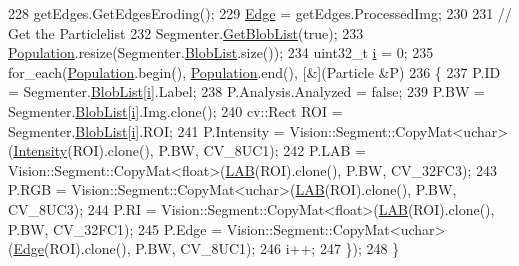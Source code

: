 \begin{DoxyCode}
228         getEdges.GetEdgesEroding();
229         \hyperlink{class_soil_analyzer_1_1_soil_ab867a74ecebcd5a3d84e2f9ea806b874}{Edge} = getEdges.ProcessedImg;
230 
231         \textcolor{comment}{// Get the Particlelist}
232         Segmenter.\hyperlink{class_vision_1_1_segment_a6dba1b8506fe7e8054e99ea5330d4abc}{GetBlobList}(\textcolor{keyword}{true});
233         \hyperlink{class_soil_analyzer_1_1_sample_ab87a190f2b4a49bc71b355f9c52d8aa4}{Population}.resize(Segmenter.\hyperlink{class_vision_1_1_segment_a74e0600a7dd49bd7110ee27bb4cd6e0e}{BlobList}.size());
234         uint32\_t \hyperlink{_comparision_pictures_2_createtest_image_8m_a6f6ccfcf58b31cb6412107d9d5281426}{i} = 0;
235         for\_each(\hyperlink{class_soil_analyzer_1_1_sample_ab87a190f2b4a49bc71b355f9c52d8aa4}{Population}.begin(), \hyperlink{class_soil_analyzer_1_1_sample_ab87a190f2b4a49bc71b355f9c52d8aa4}{Population}.end(), [&](Particle &P) 
236         \{
237             P.ID = Segmenter.\hyperlink{class_vision_1_1_segment_a74e0600a7dd49bd7110ee27bb4cd6e0e}{BlobList}[\hyperlink{_comparision_pictures_2_createtest_image_8m_a6f6ccfcf58b31cb6412107d9d5281426}{i}].Label;
238             P.Analysis.Analyzed = \textcolor{keyword}{false};
239             P.BW = Segmenter.\hyperlink{class_vision_1_1_segment_a74e0600a7dd49bd7110ee27bb4cd6e0e}{BlobList}[\hyperlink{_comparision_pictures_2_createtest_image_8m_a6f6ccfcf58b31cb6412107d9d5281426}{i}].Img.clone();
240             cv::Rect ROI = Segmenter.\hyperlink{class_vision_1_1_segment_a74e0600a7dd49bd7110ee27bb4cd6e0e}{BlobList}[\hyperlink{_comparision_pictures_2_createtest_image_8m_a6f6ccfcf58b31cb6412107d9d5281426}{i}].ROI;
241             P.Intensity = Vision::Segment::CopyMat<uchar>(\hyperlink{class_soil_analyzer_1_1_soil_a6f56200f2722df5b849d8cddd094c852}{Intensity}(ROI).clone(), P.BW, CV\_8UC1);
242             P.LAB = Vision::Segment::CopyMat<float>(\hyperlink{class_soil_analyzer_1_1_soil_a59ee773ff73380a12b1c2af3b86f6638}{LAB}(ROI).clone(), P.BW, CV\_32FC3);
243             P.RGB = Vision::Segment::CopyMat<uchar>(\hyperlink{class_soil_analyzer_1_1_soil_a59ee773ff73380a12b1c2af3b86f6638}{LAB}(ROI).clone(), P.BW, CV\_8UC3);
244             P.RI = Vision::Segment::CopyMat<float>(\hyperlink{class_soil_analyzer_1_1_soil_a59ee773ff73380a12b1c2af3b86f6638}{LAB}(ROI).clone(), P.BW, CV\_32FC1);
245             P.Edge = Vision::Segment::CopyMat<uchar>(\hyperlink{class_soil_analyzer_1_1_soil_ab867a74ecebcd5a3d84e2f9ea806b874}{Edge}(ROI).clone(), P.BW, CV\_8UC1);
246             i++;
247         \});
248     \}
\end{DoxyCode}


